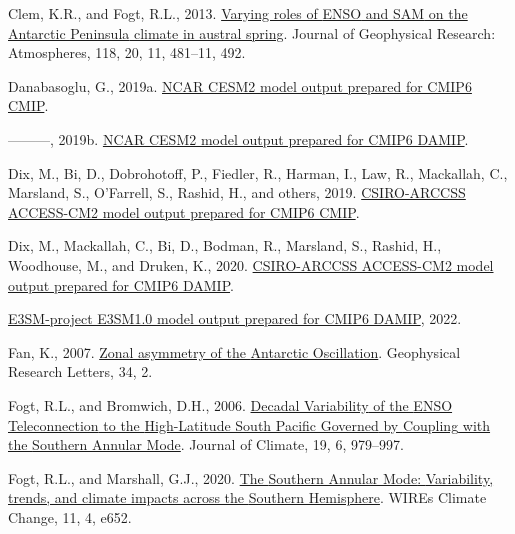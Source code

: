 \documentclass[12pt,oneside]{reedthesis}
\newlength{\cslhangindent}
\newenvironment{CSLReferences}[2] %
 {%
  \setlength{\parindent}{0pt}
  \ifodd #1 \everypar{\setlength{\hangindent}{\cslhangindent}}\ignorespaces\fi
  \ifnum #2 > 0
  \setlength{\parskip}{#2\baselineskip}
  \fi
 }%
 {}
\begin{document}
\begin{CSLReferences}{1}{0}
\leavevmode{}%
Clem, K.R., and Fogt, R.L., 2013. \href{https://doi.org/10.1002/jgrd.50860}{Varying roles of {ENSO} and {SAM} on the {Antarctic Peninsula} climate in austral spring}. Journal of Geophysical Research: Atmospheres, 118, 20, 11, 481--11, 492.

\leavevmode{}%
Danabasoglu, G., 2019a. \href{https://doi.org/10.22033/ESGF/CMIP6.2185}{NCAR CESM2 model output prepared for CMIP6 CMIP}.

\leavevmode{}%
---------, 2019b. \href{https://doi.org/10.22033/ESGF/CMIP6.2187}{NCAR CESM2 model output prepared for CMIP6 DAMIP}.

\leavevmode{}%
Dix, M., Bi, D., Dobrohotoff, P., Fiedler, R., Harman, I., Law, R., Mackallah, C., Marsland, S., O'Farrell, S., Rashid, H., and others, 2019. \href{https://doi.org/10.22033/ESGF/CMIP6.2281}{CSIRO-ARCCSS ACCESS-CM2 model output prepared for CMIP6 CMIP}.

\leavevmode{}%
Dix, M., Mackallah, C., Bi, D., Bodman, R., Marsland, S., Rashid, H., Woodhouse, M., and Druken, K., 2020. \href{https://doi.org/10.22033/ESGF/CMIP6.14361}{CSIRO-ARCCSS ACCESS-CM2 model output prepared for CMIP6 DAMIP}.

\leavevmode{}%
\href{http://cera-www.dkrz.de/WDCC/meta/CMIP6/CMIP6.DAMIP.E3SM-Project.E3SM-1-0}{E3SM-project E3SM1.0 model output prepared for CMIP6 DAMIP}, 2022.

\leavevmode{}%
Fan, K., 2007. \href{https://doi.org/10.1029/2006GL028045}{Zonal asymmetry of the {Antarctic Oscillation}}. Geophysical Research Letters, 34, 2.

\leavevmode{}%
Fogt, R.L., and Bromwich, D.H., 2006. \href{https://doi.org/10.1175/JCLI3671.1}{Decadal {Variability} of the {ENSO Teleconnection} to the {High-Latitude South Pacific Governed} by {Coupling} with the {Southern Annular Mode}}. Journal of Climate, 19, 6, 979--997.

\leavevmode{}%
Fogt, R.L., and Marshall, G.J., 2020. \href{https://doi.org/10.1002/wcc.652}{The {Southern Annular Mode}: {Variability}, trends, and climate impacts across the {Southern Hemisphere}}. WIREs Climate Change, 11, 4, e652.


\end{CSLReferences}
\end{document}
